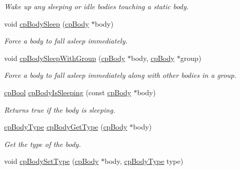 \begin{DoxyCompactItemize}
\begin{DoxyCompactList}\small\item\em Wake up any sleeping or idle bodies touching a static body. \end{DoxyCompactList}\item 
\hypertarget{group__cp_body_ga7308ff2bd6dc2832230636c02c682e82}{}void \hyperlink{group__cp_body_ga7308ff2bd6dc2832230636c02c682e82}{cp\+Body\+Sleep} (\hyperlink{structcp_body}{cp\+Body} $\ast$body)\label{group__cp_body_ga7308ff2bd6dc2832230636c02c682e82}

\begin{DoxyCompactList}\small\item\em Force a body to fall asleep immediately. \end{DoxyCompactList}\item 
\hypertarget{group__cp_body_gaaa53f3fb37c705c4fbbd5b607f29c721}{}void \hyperlink{group__cp_body_gaaa53f3fb37c705c4fbbd5b607f29c721}{cp\+Body\+Sleep\+With\+Group} (\hyperlink{structcp_body}{cp\+Body} $\ast$body, \hyperlink{structcp_body}{cp\+Body} $\ast$group)\label{group__cp_body_gaaa53f3fb37c705c4fbbd5b607f29c721}

\begin{DoxyCompactList}\small\item\em Force a body to fall asleep immediately along with other bodies in a group. \end{DoxyCompactList}\item 
\hypertarget{group__cp_body_ga8f75f810cec9ad146fcd503488df8d55}{}\hyperlink{group__basic_types_gabc5e752c48f3449ca26ef413ecbd647e}{cp\+Bool} \hyperlink{group__cp_body_ga8f75f810cec9ad146fcd503488df8d55}{cp\+Body\+Is\+Sleeping} (const \hyperlink{structcp_body}{cp\+Body} $\ast$body)\label{group__cp_body_ga8f75f810cec9ad146fcd503488df8d55}

\begin{DoxyCompactList}\small\item\em Returns true if the body is sleeping. \end{DoxyCompactList}\item 
\hypertarget{group__cp_body_ga947a39ca26772e1aad0e7b8e3634235d}{}\hyperlink{group__cp_body_ga3581b128fd3e2734952aeac8545fd5ca}{cp\+Body\+Type} \hyperlink{group__cp_body_ga947a39ca26772e1aad0e7b8e3634235d}{cp\+Body\+Get\+Type} (\hyperlink{structcp_body}{cp\+Body} $\ast$body)\label{group__cp_body_ga947a39ca26772e1aad0e7b8e3634235d}

\begin{DoxyCompactList}\small\item\em Get the type of the body. \end{DoxyCompactList}\item 
\hypertarget{group__cp_body_ga3af16c5f7275320181b1f9a2646d89f7}{}void \hyperlink{group__cp_body_ga3af16c5f7275320181b1f9a2646d89f7}{cp\+Body\+Set\+Type} (\hyperlink{structcp_body}{cp\+Body} $\ast$body, \hyperlink{group__cp_body_ga3581b128fd3e2734952aeac8545fd5ca}{cp\+Body\+Type} type)\label{group__cp_body_ga3af16c5f7275320181b1f9a2646d89f7}


\end{DoxyCompactItemize}
